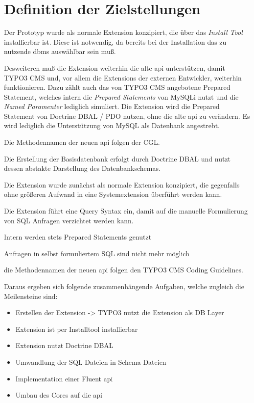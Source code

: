 \section{Definition der Zielstellungen}
\label{prototype:sec:concept}
Der Prototyp wurde als normale Extension konzipiert, die über das \textit{Install Tool} installierbar ist. Diese ist notwendig, da bereits bei der Installation das zu nutzende \gls{dbms} auswählbar sein muß.

Desweiteren muß die Extension weiterhin die alte \gls{api} unterstützen, damit TYPO3 CMS und, vor allem die Extensions der externen Entwickler, weiterhin funktionieren. Dazu zählt auch das von TYPO3 CMS angebotene Prepared Statement, welches intern die \textit{Prepared Statements} von MySQLi nutzt und die \textit{Named Paramenter} lediglich simuliert. Die Extension wird die Prepared Statement von Doctrine DBAL / PDO nutzen, ohne die alte \gls{api} zu verändern.
Es wird lediglich die Unterstützung von MySQL als Datenbank angestrebt.

Die Methodennamen der neuen \gls{api} folgen der CGL.

Die Erstellung der Basisdatenbank erfolgt durch Doctrine DBAL und nutzt dessen abstakte Darstellung des Datenbankschemas.

Die Extension wurde zunächst als normale Extension konzipiert, die gegenfalls ohne größeren Aufwand in eine Systemextension überführt werden kann.

Die Extension führt eine Query Syntax ein, damit auf die manuelle Formulierung von SQL Anfragen verzichtet werden kann.

Intern werden stets Prepared Statements genutzt

Anfragen in selbst formuliertem SQL sind nicht mehr möglich

die Methodennamen der neuen \gls{api} folgen den TYPO3 CMS Coding Guidelines.

Daraus ergeben sich folgende zusammenhängende Aufgaben, welche zugleich die Meilensteine sind:

\begin{itemize}
\item Erstellen der Extension -> TYPO3 nutzt die Extension als DB Layer
\item Extension ist per Installtool installierbar
\item Extension nutzt Doctrine DBAL
\item Umwandlung der SQL Dateien in Schema Dateien
\item Implementation einer Fluent \gls{api}
\item Umbau des Cores auf die \gls{api}
\end{itemize}

